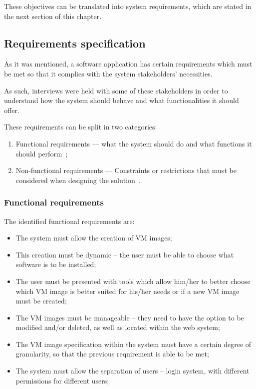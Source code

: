 These objectives can be translated into system requirements, which are stated in the next section of this chapter.

\subsection{Requirements specification}\label{subsec:requirements}

As it was mentioned, a software application has certain requirements which must be met so that it complies with the system stakeholders' necessities.

As such, interviews were held with some of these stakeholders in order to understand how the system should behave and what functionalities it should offer.

These requirements can be split in two categories:

\begin{enumerate}
\item Functional requirements --- what the system should do and what functions it should perform~\cite{http://dictionary.reference.com/browse/functional+requirements};
\item Non-functional requirements --- Constraints or restrictions that must be considered when designing the solution~\cite{http://www.requirementsauthority.com/functional-and-non-functional.html}.
\end{enumerate}

\subsubsection{Functional requirements}\label{subsubsec:funct-reqs}

The identified functional requirements are:

\begin{itemize}
\item The system must allow the creation of VM images;
\item This creation must be dynamic -- the user must be able to choose what software is to be installed;
\item The user must be presented with tools which allow him/her to better choose which VM image is better suited for his/her needs or if a new VM image must be created;
\item The VM images must be manageable -- they need to have the option to be modified and/or deleted, as well as located within the web system;
\item The VM image specification within the system must have a certain degree of granularity, so that the previous requirement is able to be met;
\item The system must allow the separation of users -- login system, with different permissions for different users;
\end{itemize}

